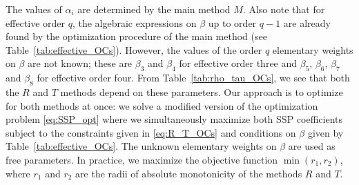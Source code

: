 The values of $\alpha_i$ are determined by the main method $M$.
Also note that for effective order $q$, the algebraic expressions on
$\beta$ up to order $q-1$ are already found by the optimization procedure of 
the main method (see Table~\ref{tab:effective_OCs}). 
However, the values of the order $q$ elementary weights on $\beta$ are not 
known; these are $\beta_3$ and $\beta_4$ for effective order three and
$\beta_5$, $\beta_6$, $\beta_7$ and $\beta_8$ for effective order four.
From Table~\ref{tab:rho_tau_OCs}, we see that both the $R$ and $T$
methods depend on these parameters.
Our approach is to optimize for both methods at once: we solve a
modified version of the optimization problem \eqref{eq:SSP_opt} where
we simultaneously maximize both SSP coefficients subject to the
constraints given in \eqref{eq:R_T_OCs} and conditions on $\beta$ given by 
Table~\ref{tab:effective_OCs}. 
The unknown elementary weights on $\beta$ are used as free parameters.
In practice, we maximize the objective function $\min(r_1,r_2)$, where $r_1$ 
and $r_2$ are the radii of absolute monotonicity of the methods $R$ and $T$.

